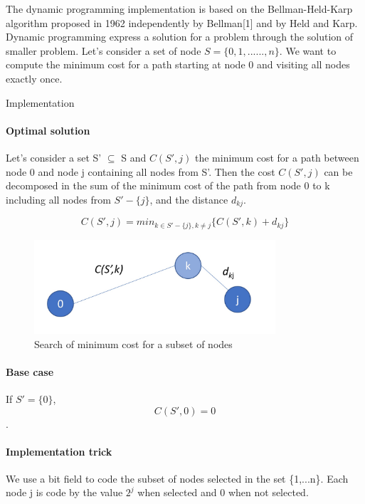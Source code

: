 \documentclass[../report.tex]{subfiles}
\begin{document}
The dynamic programming implementation is based on the Bellman-Held-Karp algorithm  proposed in 1962 independently by Bellman[1] and by Held and Karp.
\newline{}
Dynamic programming express a solution for a problem through the solution of smaller problem.
\newline{}
Let's consider a set of node $S=\{0,1,......,n\}$. We want to compute the minimum cost for a path starting at node 0 and visiting all nodes exactly once.


\begin{subsection}{Implementation}
\paragraph{Optimal solution}\hfill \break
Let's consider a set S' $\subseteq$ S and $C(S',j)$ the minimum cost for a path between node 0 and node j containing all nodes from S'. Then the cost $C(S',j)$ can be decomposed in the sum of the minimum cost of the path from node 0 to k including all nodes from $S'-\{j\}$, and the distance $d_{kj}$.

$$C(S',j)=min_{k \in S'-\{j\}, k \ne j}\{C(S',k)+d_{kj}\}$$

\begin{figure}[H]
\centering
\includegraphics[height=3.5cm,valign=t]{dp_graphalgo.jpg}
\caption{Search of minimum cost for a subset of nodes \label{fig:dpgraphalgo}}
\end{figure}

\paragraph{Base case}\hfill \break
If $S'=\{0\}$, $$C(S',0)=0$$.

\paragraph{Implementation trick}\hfill \break
We use a bit field to code the subset of nodes selected in the set \{1,...n\}.
Each node j is code by the value $2^j$ when selected and 0 when not selected. 
\end{subsection}
\end{document}
